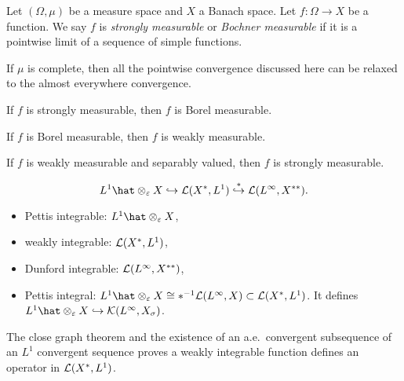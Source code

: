 \documentclass{../../large}
\begin{document}
\begin{prb}
Let $(\Omega,\mu)$ be a measure space and $X$ a Banach space.
Let $f:\Omega\to X$ be a function.
We say $f$ is \emph{strongly measurable} or \emph{Bochner measurable} if it is a pointwise limit of a sequence of simple functions.

If $\mu$ is complete, then all the pointwise convergence discussed here can be relaxed to the almost everywhere convergence.
\begin{parts}
\item If $f$ is strongly measurable, then $f$ is Borel measurable.
\item If $f$ is Borel measurable, then $f$ is weakly measurable.
\item If $f$ is weakly measurable and separably valued, then $f$ is strongly measurable.
\end{parts}
\end{prb}

\begin{prb}
\[L^1\hat\otimes_\e X\hookrightarrow\cL(X^*,L^1)\stackrel{*}{\hookrightarrow}\cL(L^\infty,X^{**}).\]
\begin{itemize}
\item Pettis integrable: $L^1\hat\otimes_\e X$,
\item weakly integrable: $\mathcal{L}(X^*,L^1)$,
\item Dunford integrable: $\mathcal{L}(L^\infty,X^{**})$,
\item Pettis integral: $L^1\hat\otimes_\e X\cong *^{-1}\cL(L^\infty,X)\subset\cL(X^*,L^1)$. It defines $L^1\hat\otimes_\e X\hookrightarrow\cK(L^\infty,X_\sigma)$.
\end{itemize}

\begin{parts}
\item The close graph theorem and the existence of an a.e.~convergent subsequence of an $L^1$ convergent sequence proves a weakly integrable function defines an operator in $\mathcal{L}(X^*,L^1)$.
\end{parts}
\end{prb}
\end{document}
